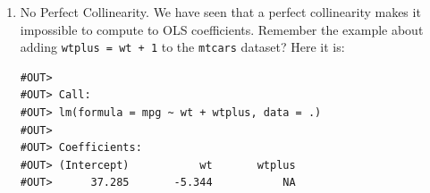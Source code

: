 \documentclass[]{book}
\newenvironment{Shaded}{\begin{snugshade}}{\end{snugshade}}
\newcommand{\KeywordTok}[1]{\textcolor[rgb]{0.13,0.29,0.53}{\textbf{#1}}}
\newcommand{\DataTypeTok}[1]{\textcolor[rgb]{0.13,0.29,0.53}{#1}}
\newcommand{\DecValTok}[1]{\textcolor[rgb]{0.00,0.00,0.81}{#1}}
\newcommand{\StringTok}[1]{\textcolor[rgb]{0.31,0.60,0.02}{#1}}
\newcommand{\OperatorTok}[1]{\textcolor[rgb]{0.81,0.36,0.00}{\textbf{#1}}}
\newcommand{\NormalTok}[1]{#1}
\begin{document}
\begin{enumerate}
\def\labelenumi{\arabic{enumi}.}
\item
  No Perfect Collinearity. We have seen that a perfect collinearity
  makes it impossible to compute to OLS coefficients. Remember the
  example about adding \texttt{wtplus\ =\ wt\ +\ 1} to the
  \texttt{mtcars} dataset? Here it is:

\begin{Shaded}
\end{Shaded}

\begin{verbatim}
#OUT> 
#OUT> Call:
#OUT> lm(formula = mpg ~ wt + wtplus, data = .)
#OUT> 
#OUT> Coefficients:
#OUT> (Intercept)           wt       wtplus  
#OUT>      37.285       -5.344           NA
\end{verbatim}


\end{enumerate}
\end{document}

